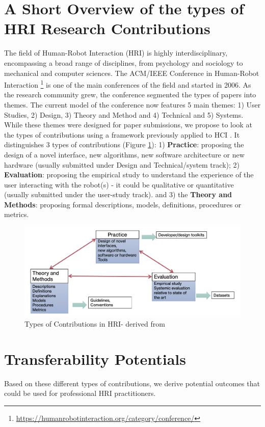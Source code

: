 \documentclass[letterpaper]{article} %
\begin{document}
\section{A Short Overview of the types of HRI Research Contributions}
The field of Human-Robot Interaction (HRI) is highly interdisciplinary, encompassing a broad range of disciplines, from psychology and sociology to mechanical and computer sciences.
The ACM/IEEE Conference in Human-Robot Interaction \footnote{\url{https://humanrobotinteraction.org/category/conference/}} is one of the main conferences of the field and started in 2006. As the research community grew, the conference segmented the types of papers into themes. The current model of the conference now features 5 main themes: 1) User Studies, 2) Design, 3) Theory and Method and 4) Technical and 5) Systems.
While these themes were designed for paper submissions, we propose to look at the types of contributions using a framework previously applied to HCI \cite{SReeves}. It distinguishes 3 types of contributions (Figure \ref{fig:tri}):
1) \textbf{Practice}: proposing the design of a novel interface, new algorithms, new software architecture or new hardware (usually submitted under Design and Technical/system track); 2) \textbf{Evaluation}: proposing the empirical study to understand the experience of the user interacting with the robot(s) - it could be qualitative or quantitative (usually submitted under the user-study track). and 3) the \textbf{Theory and Methods}: proposing formal descriptions, models, definitions, procedures or metrics.

\begin{figure}
    \centering
    \includegraphics[width=\linewidth]{flow.png}
    \caption{Types of Contributions in HRI- derived from \cite{SReeves}}
    \label{fig:tri}
\end{figure}

\section{Transferability Potentials}
Based on these different types of contributions, we derive potential outcomes that could be used for professional HRI practitioners.
\end{document}
